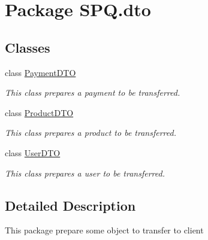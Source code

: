\hypertarget{namespace_s_p_q_1_1dto}{}\section{Package S\+P\+Q.\+dto}
\label{namespace_s_p_q_1_1dto}
\subsection*{Classes}
\begin{DoxyCompactItemize}
\item 
class \mbox{\hyperlink{class_s_p_q_1_1dto_1_1_payment_d_t_o}{Payment\+D\+TO}}
\begin{DoxyCompactList}\small\item\em This class prepares a payment to be transferred. \end{DoxyCompactList}\item 
class \mbox{\hyperlink{class_s_p_q_1_1dto_1_1_product_d_t_o}{Product\+D\+TO}}
\begin{DoxyCompactList}\small\item\em This class prepares a product to be transferred. \end{DoxyCompactList}\item 
class \mbox{\hyperlink{class_s_p_q_1_1dto_1_1_user_d_t_o}{User\+D\+TO}}
\begin{DoxyCompactList}\small\item\em This class prepares a user to be transferred. \end{DoxyCompactList}\end{DoxyCompactItemize}


\subsection{Detailed Description}
This package prepare some object to transfer to client 